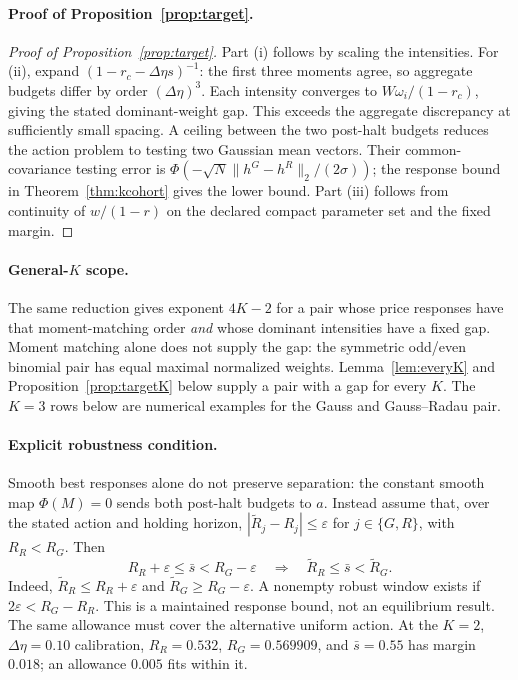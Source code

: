 \documentclass[12pt]{article}
\theoremstyle{definition}
\theoremstyle{remark}
\begin{document}
\paragraph{Proof of Proposition~\ref{prop:target}.}
\begin{proof}[Proof of Proposition~\ref{prop:target}]
Part (i) follows by scaling the intensities. For (ii), expand $(1-r_c-\Delta\eta s)^{-1}$: the first three moments agree, so aggregate budgets differ by order $(\Delta\eta)^3$. Each intensity converges to $W\omega_i/(1-r_c)$, giving the stated dominant-weight gap. This exceeds the aggregate discrepancy at sufficiently small spacing. A ceiling between the two post-halt budgets reduces the action problem to testing two Gaussian mean vectors. Their common-covariance testing error is $\Phi(-\sqrt N\|h^G-h^R\|_2/(2\sigma))$; the response bound in Theorem~\ref{thm:kcohort} gives the lower bound. Part (iii) follows from continuity of $w/(1-r)$ on the declared compact parameter set and the fixed margin.
\end{proof}

\paragraph{General-$K$ scope.} The same reduction gives exponent $4K-2$ for a pair whose price responses have that moment-matching order \emph{and} whose dominant intensities have a fixed gap. Moment matching alone does not supply the gap: the symmetric odd/even binomial pair has equal maximal normalized weights. Lemma~\ref{lem:everyK} and Proposition~\ref{prop:targetK} below supply a pair with a gap for every $K$. The $K=3$ rows below are numerical examples for the Gauss and Gauss--Radau pair.

\paragraph{Explicit robustness condition.} Smooth best responses alone do not preserve separation: the constant smooth map $\Phi(M)=0$ sends both post-halt budgets to $a$. Instead assume that, over the stated action and holding horizon, $|\widetilde R_j-R_j|\le\varepsilon$ for $j\in\{G,R\}$, with $R_R<R_G$. Then
\begin{equation}\label{eq:reopt_gap}
 R_R+\varepsilon\le\bar s<R_G-\varepsilon
 \quad\Longrightarrow\quad \widetilde R_R\le\bar s<\widetilde R_G.
\end{equation}
Indeed, $\widetilde R_R\le R_R+\varepsilon$ and $\widetilde R_G\ge R_G-\varepsilon$. A nonempty robust window exists if $2\varepsilon<R_G-R_R$. This is a maintained response bound, not an equilibrium result. The same allowance must cover the alternative uniform action. At the $K=2$, $\Delta\eta=0.10$ calibration, $R_R=0.532$, $R_G=0.569909$, and $\bar s=0.55$ has margin $0.018$; an allowance $0.005$ fits within it.
\end{document}
